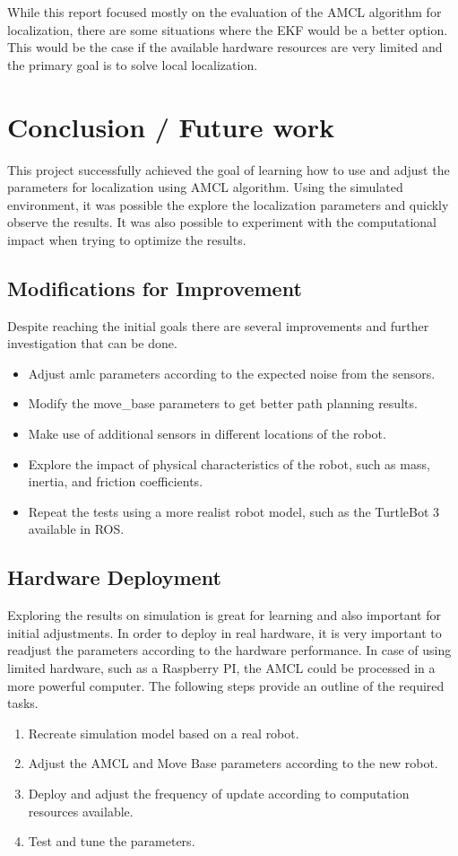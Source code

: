 \documentclass[10pt,journal,compsoc]{IEEEtran}
\begin{document}
While this report focused mostly on the evaluation of the AMCL algorithm for localization, there are some situations where the EKF would be a better option. This would be the case if the available hardware resources are very limited and the primary goal is to solve local localization.


\section{Conclusion / Future work}
This project successfully achieved the goal of learning how to use and adjust the parameters for localization using AMCL algorithm. Using the simulated environment, it was possible the explore the localization parameters and quickly observe the results. It was also possible to experiment with the computational impact when trying to optimize the results.  

\subsection{Modifications for Improvement}

Despite reaching the initial goals there are several improvements and further investigation that can be done.

\begin{itemize}
\item Adjust amlc parameters according to the expected noise from the sensors.
\item Modify the move\_base parameters to get better path planning results.
\item Make use of additional sensors in different locations of the robot.
\item Explore the impact of physical characteristics of the robot, such as mass, inertia, and friction coefficients. 
\item Repeat the tests using a more realist robot model, such as the TurtleBot 3 available in ROS.
\end{itemize}

\subsection{Hardware Deployment}
Exploring the results on simulation is great for learning and also important for initial adjustments. In order to deploy in real hardware, it is very important to readjust the parameters according to the hardware performance. In case of using limited hardware, such as a Raspberry PI, the AMCL could be processed in a more powerful computer.
The following steps provide an outline of the required tasks.
\begin{enumerate}
\item Recreate simulation model based on a real robot.
\item Adjust the AMCL and Move Base parameters according to the new robot.
\item Deploy and adjust the frequency of update according to computation resources available.
\item Test and tune the parameters.
\end{enumerate}



\end{document}
